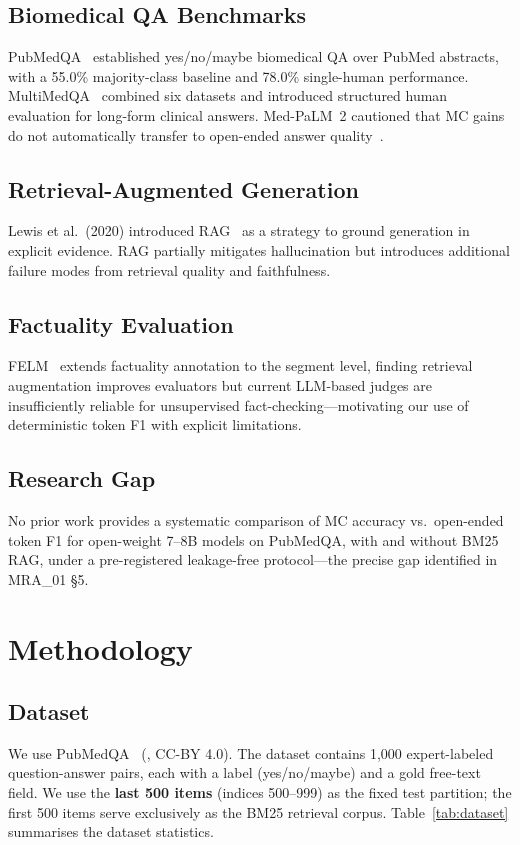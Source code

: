 \documentclass[sigconf, nonacm]{acmart}
\begin{document}
\subsection{Biomedical QA Benchmarks}
PubMedQA~\cite{Jin2019} established yes/no/maybe biomedical QA over PubMed abstracts,
with a 55.0\% majority-class baseline and 78.0\% single-human performance.
MultiMedQA~\cite{Singhal2023} combined six datasets and introduced structured human
evaluation for long-form clinical answers. Med-PaLM~2 cautioned that MC gains do not
automatically transfer to open-ended answer quality~\cite{Singhal2025}.

\subsection{Retrieval-Augmented Generation}
Lewis et al.\ (2020) introduced RAG~\cite{Lewis2020} as a strategy to ground
generation in explicit evidence. RAG partially mitigates hallucination but introduces
additional failure modes from retrieval quality and faithfulness.

\subsection{Factuality Evaluation}
FELM~\cite{Chen2023} extends factuality annotation to the segment level, finding
retrieval augmentation improves evaluators but current LLM-based judges are
insufficiently reliable for unsupervised fact-checking---motivating our use of
deterministic token F1 with explicit limitations.

\subsection{Research Gap}
No prior work provides a systematic comparison of MC accuracy vs.\ open-ended token F1
for open-weight 7--8B models on PubMedQA, with and without BM25 RAG, under a
pre-registered leakage-free protocol---the precise gap identified in MRA\_01 \S5.

\section{Methodology}

\subsection{Dataset}
We use PubMedQA~\cite{Jin2019} (, CC-BY 4.0).
The dataset contains 1,000 expert-labeled question-answer pairs,
each with a  label (yes/no/maybe) and a
 gold free-text field.
We use the \textbf{last 500 items} (indices 500--999) as the fixed test partition;
the first 500 items serve exclusively as the BM25 retrieval corpus.
Table~\ref{tab:dataset} summarises the dataset statistics.
\end{document}
